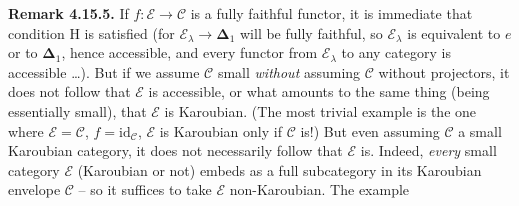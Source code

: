\documentclass[11pt]{article}
\newcommand{\cE}{\mathcal{E}}
\newcommand{\cC}{\mathcal{C}}
\newcommand{\id}{\mathrm{id}}
\begin{document}
\textbf{Remark 4.15.5.} If $f : \cE \longrightarrow \cC$ is a fully faithful functor, it is immediate that condition H is satisfied (for $\cE_{\lambda} \longrightarrow \mathbf{\Delta}_1$ will be fully faithful, so $\cE_{\lambda}$ is equivalent
to $e$ or to $\mathbf{\Delta}_1$, hence accessible, and every functor from $\cE_{\lambda}$ to any category is %
accessible \dots). But if we assume $\cC$ small \textit{without} assuming $\cC$ without projectors, it does not follow that $\cE$ is accessible, or what amounts to the same thing (being essentially small), that $\cE$ is Karoubian. (The most trivial example is the one where $\cE = \cC$, $f = \id_{\cC}$, $\cE$ is Karoubian only if $\cC$ is!) But even assuming $\cC$ a small Karoubian category, it does not necessarily follow that $\cE$ is. Indeed, \textit{every} small category $\cE$ (Karoubian or not) embeds as a full subcategory in its Karoubian envelope $\cC$ -- so it suffices to take $\cE$ non-Karoubian. The example
\end{document}
